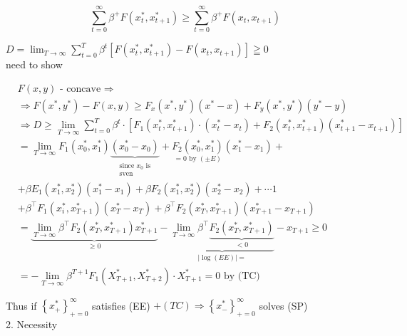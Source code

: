 \documentclass[10pt]{article}
\begin{document}
$$
\sum_{t=0}^{\infty} \beta^{+} F\left(x_{t}^{*}, x_{t+1}^{*}\right) \geqslant \sum_{t=0}^{\infty} \beta^{+} F\left(x_{t}, x_{t+1}\right)
$$

$D=\lim _{T \rightarrow \infty} \sum_{t=0}^{T} \beta^{t}\left[F\left(x_{t}^{*}, x_{t+1}^{*}\right)-F\left(x_{t}, x_{t+1}\right)\right] \geqq 0$\\
need to show

$$
\begin{aligned}
& F(x, y) \text { - concave ⇒ } \\
& \Rightarrow F\left(x^{*}, y^{*}\right)-F(x, y) \geqslant F_{x}\left(x^{*}, y^{*}\right)\left(x^{*}-x\right)+F_{y}\left(x^{*}, y^{*}\right)\left(y^{*}-y\right) \\
& \Rightarrow D \geqslant \lim _{T \rightarrow \infty} \sum_{t=0}^{T} \beta^{t} \cdot\left[F_{1}\left(x_{t}^{*}, x_{t+1}^{*}\right) \cdot\left(x_{t}^{*}-x_{t}\right)+F_{2}\left(x_{t}^{*}, x_{t+1}^{*}\right)\left(x_{t+1}^{*}-x_{t+1}\right)\right] \\
& =\lim _{T \rightarrow \infty} F_{1}\left(x_{0}^{*}, x_{1}^{*}\right) \underbrace{\left(x_{0}^{*}-x_{0}\right)}_{\substack{\text { since } x_{0} \text { is } \\
\text { sven }}}+\underset{=0 \text { by }( \pm E)}{F_{2}\left(x_{0}^{*}, x_{1}^{*}\right)}\left(x_{1}^{*}-x_{1}\right)+ \\
& +\beta E_{1}\left(x_{1}^{*}, x_{2}^{*}\right)\left(x_{1}^{*}-x_{1}\right)+\beta F_{2}\left(x_{1}^{*}, x_{2}^{*}\right)\left(x_{2}^{*}-x_{2}\right)+\cdots 1 \\
& +\beta^{\top} F_{1}\left(x_{i}^{*}, x_{T+1}^{*}\right)\left(x_{T}^{*}-x_{T}\right)+\beta^{\top} F_{2}\left(x_{T}^{*}, x_{T+1}^{*}\right)\left(x_{T+1}^{*}-x_{T+1}\right) \\
& =\underbrace{\lim _{T \rightarrow \infty} \beta^{\top} F_{2}\left(x_{T}^{*}, x_{T+1}^{*}\right) x_{T+1}^{*}}_{\geqslant 0}-\underbrace{\lim _{T \rightarrow \infty} \beta^{\top} \underbrace{F_{2}\left(x_{T}^{*}, x_{T+1}^{*}\right)}_{<0}}_{|\log (E E)|=}-x_{T+1} \geq 0 \\
& =-\lim _{T \rightarrow \infty} \beta^{T+1} F_{1}\left(X_{T+1}^{*}, X_{T+2}^{*}\right) \cdot X_{T+1}^{*}=0 \text { by (TC) }
\end{aligned}
$$

Thus if $\left\{x_{+}^{*}\right\}_{+=0}^{\infty}$ satisfies (EE) $+(T C) \Rightarrow\left\{x_{-}^{*}\right\}_{+=0}^{\infty}$ solves (SP)\\
2. Necessity
\end{document}
